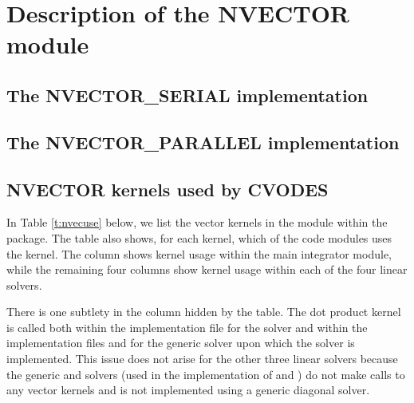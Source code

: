 \chapter{Description of the NVECTOR module}\label{s:nvector}


\section{The NVECTOR\_SERIAL implementation}\label{ss:nvec_ser}


\section{The NVECTOR\_PARALLEL implementation}\label{ss:nvec_par}


\section{NVECTOR kernels used by CVODES}

In Table \ref{t:nvecuse} below, we list the vector kernels in the 
{\nvector} module within the {\cvodes} package.
The table also shows, for each kernel, which of the code modules uses
the kernel. The {\cvodes} column shows kernel usage within the main
integrator module, while the remaining four columns show kernel usage
within each of the four {\cvodes} linear solvers. 

There is one subtlety in the {\cvspgmr} column hidden by the table. 
The dot product kernel  is called both within the 
implementation file  for the {\cvspgmr} solver and within 
the implementation files  and  for the generic {\spgmr} 
solver upon which the {\cvspgmr} solver is implemented. 
This issue does not arise for the other 
three {\cvodes} linear solvers because the generic {\dense} and {\band} solvers 
(used in the implementation of {\cvdense} and {\cvband}) do not make calls to 
any vector kernels and {\cvdiag} is not implemented using a generic diagonal solver. 

